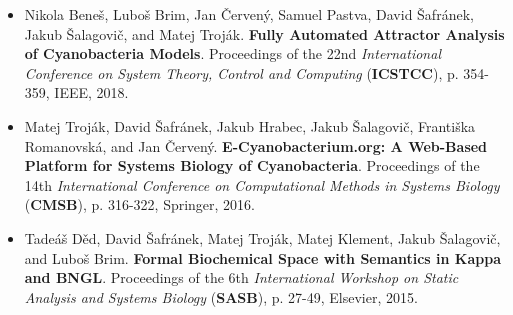 \documentclass[letterpaper,11pt]{article}
\begin{document}
{\begin{itemize}
    \item Nikola Beneš, Luboš Brim, Jan Červený, Samuel Pastva, David Šafránek, Jakub Šalagovič, and Matej Troják. \textbf{Fully Automated Attractor Analysis of Cyanobacteria Models}. Proceedings of the 22nd \emph{International Conference on System Theory, Control and Computing} (\textbf{ICSTCC}), p. 354-359, IEEE, 2018.
    \item Matej Troják, David Šafránek, Jakub Hrabec, Jakub Šalagovič, Františka Romanovská, and Jan Červený. \textbf{E-Cyanobacterium.org: A Web-Based Platform for Systems Biology of Cyanobacteria}. Proceedings of the 14th \emph{International Conference on Computational Methods in Systems Biology} (\textbf{CMSB}), p. 316-322, Springer, 2016.
    \item Tadeáš Děd, David Šafránek, Matej Troják, Matej Klement, Jakub Šalagovič, and Luboš Brim. \textbf{Formal Biochemical Space with Semantics in Kappa and BNGL}. Proceedings of the 6th \emph{International Workshop on Static Analysis and Systems Biology} (\textbf{SASB}), p. 27-49, Elsevier, 2015.
  \end{itemize}
}


\end{document}
